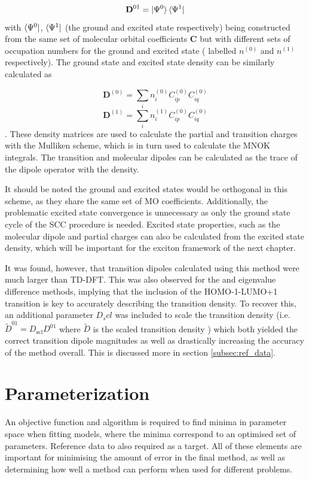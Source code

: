 \begin{equation}
\mathbf{D}^{01} = \ket{\Psi^0} \bra{\Psi^1} 
\end{equation}
%
with $\bra{\Psi^0}$, $\bra{\Psi^1}$ (the ground and excited state respectively)
being constructed from the same set of molecular orbital coefficients $\mathbf{C}$
but with different sets of occupation numbers for the ground and excited state (
labelled $n^{\left(0\right)}$ and $n^{\left(1\right)}$ respectively). The ground state
and excited state density can be similarly calculated as

\begin{equation}
\mathbf{D}^{\left(0\right)} = \sum_i n^{\left(0\right)}_i C^{\left(0\right)}_{ip} C^{\left(0\right)}_{iq}
\end{equation}
%
\begin{equation}
    \mathbf{D}^{\left(1\right)} = \sum_i n^{\left(1\right)}_i C^{\left(0\right)}_{ip} C^{\left(0\right)}_{iq} 
\end{equation}
%
. These density matrices are used to calculate the partial and transition charges
with the Mulliken scheme, which is in turn used to calculate the MNOK integrals.
The transition and molecular dipoles can be calculated as the trace of the dipole
operator with the density.

It should be noted the ground and excited states would be orthogonal in this scheme,
as they share the same set of MO coefficients. Additionally, the problematic excited
state convergence is unnecessary as only the ground state cycle of the SCC procedure 
is needed. Excited state properties, such as the molecular dipole and partial charges 
can also be calculated from the excited state density, which will be important for 
the exciton framework of the next chapter.

It was found, however, that transition dipoles calculated using this method were
much larger than TD-DFT. This was also observed for the \dscf and eigenvalue
difference methods, implying that the inclusion of the HOMO-1-LUMO+1 transition
is key to accurately describing the transition density. To recover this, an additional
parameter $D_scl$ was included to scale the transition density (i.e. $\tilde{D}^{01} = D_{\text{scl}} D^{01}$ 
where $\tilde{D}$ is the scaled transition density ) which both yielded the correct
transition dipole magnitudes as well as drastically increasing the accuracy of the
method overall. This is discussed more in section \ref{subsec:ref_data}.

\afterpartskip
\section{Parameterization}
\label{sec:chl_params}
An objective function and algorithm is required to find minima in parameter space
when fitting models, where the minima correspond to an optimised set of parameters.
Reference data to also required as a target. All of these elements are important
for minimising the amount of error in the final method, as well as determining how
well a method can perform when used for different problems.

